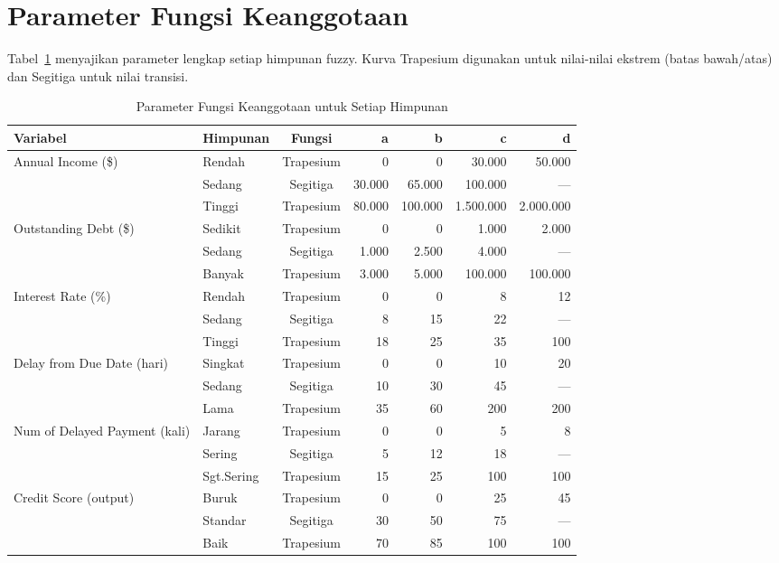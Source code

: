 \documentclass[12pt,a4paper]{report}
\begin{document}
\section{Parameter Fungsi Keanggotaan}

Tabel~\ref{tab:param_mf} menyajikan parameter lengkap setiap
himpunan fuzzy. Kurva Trapesium digunakan untuk nilai-nilai
ekstrem (batas bawah/atas) dan Segitiga untuk nilai transisi.

\begin{table}[H]
  \centering
  \caption{Parameter Fungsi Keanggotaan untuk Setiap Himpunan}
  \label{tab:param_mf}
  \renewcommand{\arraystretch}{1.2}
  \small
  \begin{tabular}{|l|l|c|r|r|r|r|}
    \hline
    \textbf{Variabel} & \textbf{Himpunan} & \textbf{Fungsi}
    & \textbf{a} & \textbf{b} & \textbf{c} & \textbf{d} \\
    \hline
    \multirow{3}{*}{Annual Income (\$)}
      & Rendah  & Trapesium & 0 & 0 & 30.000 & 50.000 \\
      & Sedang  & Segitiga  & 30.000 & 65.000 & 100.000 & — \\
      & Tinggi  & Trapesium & 80.000 & 100.000 & 1.500.000 & 2.000.000 \\
    \hline
    \multirow{3}{*}{Outstanding Debt (\$)}
      & Sedikit & Trapesium & 0 & 0 & 1.000 & 2.000 \\
      & Sedang  & Segitiga  & 1.000 & 2.500 & 4.000 & — \\
      & Banyak  & Trapesium & 3.000 & 5.000 & 100.000 & 100.000 \\
    \hline
    \multirow{3}{*}{Interest Rate (\%)}
      & Rendah  & Trapesium & 0 & 0 & 8 & 12 \\
      & Sedang  & Segitiga  & 8 & 15 & 22 & — \\
      & Tinggi  & Trapesium & 18 & 25 & 35 & 100 \\
    \hline
    \multirow{3}{*}{Delay from Due Date (hari)}
      & Singkat & Trapesium & 0 & 0 & 10 & 20 \\
      & Sedang  & Segitiga  & 10 & 30 & 45 & — \\
      & Lama    & Trapesium & 35 & 60 & 200 & 200 \\
    \hline
    \multirow{3}{*}{Num of Delayed Payment (kali)}
      & Jarang    & Trapesium & 0 & 0 & 5 & 8 \\
      & Sering    & Segitiga  & 5 & 12 & 18 & — \\
      & Sgt.Sering & Trapesium & 15 & 25 & 100 & 100 \\
    \hline
    \multirow{3}{*}{Credit Score (output)}
      & Buruk   & Trapesium & 0 & 0 & 25 & 45 \\
      & Standar & Segitiga  & 30 & 50 & 75 & — \\
      & Baik    & Trapesium & 70 & 85 & 100 & 100 \\
    \hline
  \end{tabular}
\end{table}
\end{document}

